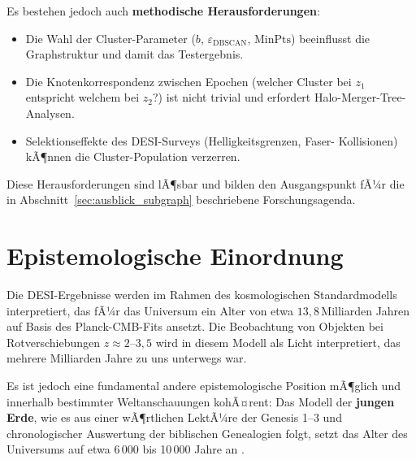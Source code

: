 ﻿\documentclass[a4paper,12pt]{article}
\theoremstyle{definition}
\theoremstyle{remark}
\begin{document}
Es bestehen jedoch auch \textbf{methodische Herausforderungen}:

\begin{itemize}
  \item Die Wahl der Cluster-Parameter ($b$, $\varepsilon_\mathrm{DBSCAN}$,
    $\mathrm{MinPts}$) beeinflusst die Graphstruktur und damit das Testergebnis.
  \item Die Knotenkorrespondenz zwischen Epochen (welcher Cluster bei $z_1$
    entspricht welchem bei $z_2$?) ist nicht trivial und erfordert
    Halo-Merger-Tree-Analysen.
  \item Selektionseffekte des DESI-Surveys (Helligkeitsgrenzen, Faser-
    Kollisionen) kÃ¶nnen die Cluster-Population verzerren.
\end{itemize}

Diese Herausforderungen sind lÃ¶sbar und bilden den Ausgangspunkt fÃ¼r
die in Abschnitt~\ref{sec:ausblick_subgraph} beschriebene Forschungsagenda.

\section{Epistemologische Einordnung}
\label{sec:schÃ¶pfung}

Die DESI-Ergebnisse werden im Rahmen des kosmologischen Standardmodells
interpretiert, das fÃ¼r das Universum ein Alter von etwa $13{,}8$\,Milliarden
Jahren auf Basis des Planck-CMB-Fits ansetzt. Die Beobachtung von Objekten
bei Rotverschiebungen $z \approx 2$--$3{,}5$ wird in diesem Modell als
Licht interpretiert, das mehrere Milliarden Jahre zu uns unterwegs war.

Es ist jedoch eine fundamental andere epistemologische Position mÃ¶glich und
innerhalb bestimmter Weltanschauungen kohÃ¤rent: Das Modell der \textbf{jungen
Erde}, wie es aus einer wÃ¶rtlichen LektÃ¼re der Genesis 1--3 und
chronologischer Auswertung der biblischen Genealogien folgt, setzt das Alter
des Universums auf etwa 6\,000 bis 10\,000 Jahre an \cite{sarfati2004,
humphreys1994}.
\end{document}
